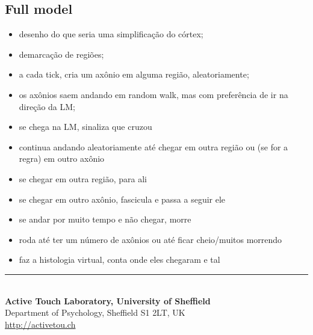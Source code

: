 \documentclass[a4paper,12pt]{texMemo}
\begin{document}
\pagebreak

\subsection{Full model}

\begin{itemize}
	
\item desenho do que seria uma simplificação do córtex;
\item demarcação de regiões;
\item a cada tick, cria um axônio em alguma região, aleatoriamente;
\item os axônios saem andando em random walk, mas com preferência de ir na direção da LM;
\item se chega na LM, sinaliza que cruzou
\item continua andando aleatoriamente até chegar em outra região ou (se for a regra) em outro axônio
\item se chegar em outra região, para ali
\item se chegar em outro axônio, fascicula e passa a seguir ele
\item se andar por muito tempo e não chegar, morre
\item roda até ter um número de axônios ou até ficar cheio/muitos morrendo
\item faz a histologia virtual, conta onde eles chegaram e tal

\end{itemize}

\vspace{\fill}
\begin{center}
	\rule{74ex}{.1mm}\\
	\textbf{Active Touch Laboratory, University of Sheffield}\\
	Department of Psychology, Sheffield S1 2LT, UK\\ 
	\href{http://activetou.ch}{http://activetou.ch}
	
\end{center}

\normalsize


\end{document}

